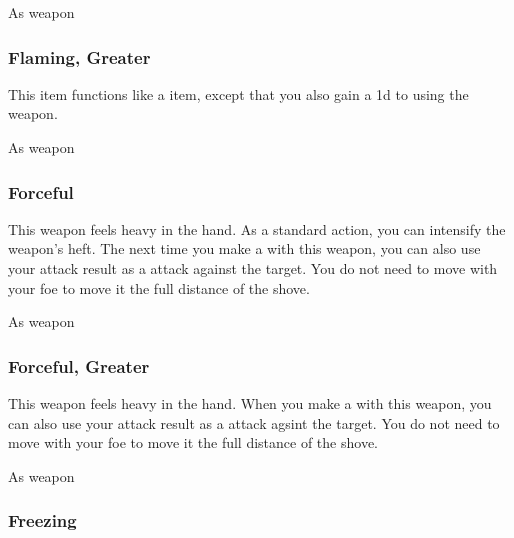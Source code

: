  As weapon


\lowercase{\hypertarget{item:Flaming, Greater}{}}\label{item:Flaming, Greater}
\hypertarget{item:Flaming, Greater}{\subsubsection{Flaming, Greater\hfill{}}}

This item functions like a  item, except that you also gain a \plus1d  to  using the weapon.



 


 As weapon


\lowercase{\hypertarget{item:Forceful}{}}\label{item:Forceful}
\hypertarget{item:Forceful}{\subsubsection{Forceful\hfill{}}}

This weapon feels heavy in the hand.
As a standard action, you can intensify the weapon's heft.
The next time you make a  with this weapon, you can also use your attack result as a  attack against the target.
You do not need to move with your foe to move it the full distance of the shove.



 As weapon


\lowercase{\hypertarget{item:Forceful, Greater}{}}\label{item:Forceful, Greater}
\hypertarget{item:Forceful, Greater}{\subsubsection{Forceful, Greater\hfill{}}}

This weapon feels heavy in the hand.
When you make a  with this weapon, you can also use your attack result as a  attack agsint the target.
You do not need to move with your foe to move it the full distance of the shove.



 As weapon


\lowercase{\hypertarget{item:Freezing}{}}\label{item:Freezing}
\hypertarget{item:Freezing}{\subsubsection{Freezing\hfill{}}}

